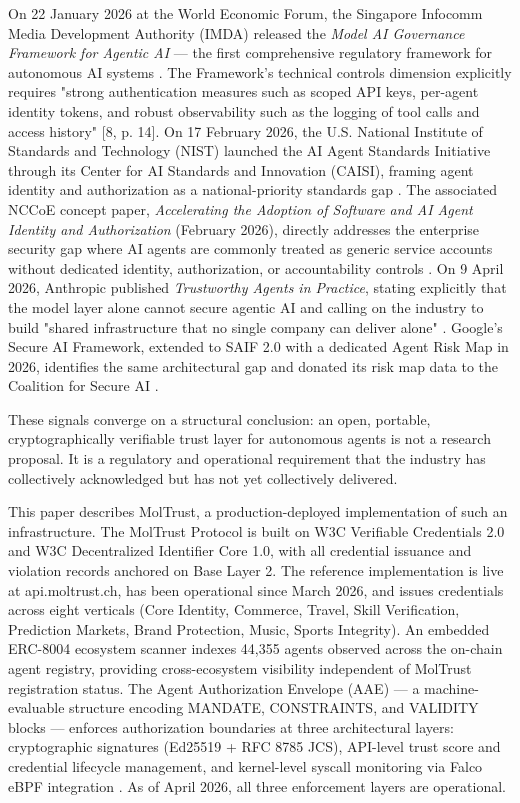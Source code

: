On 22 January 2026 at the World Economic Forum, the Singapore Infocomm Media Development Authority (IMDA) released the \textit{Model AI Governance Framework for Agentic AI} — the first comprehensive regulatory framework for autonomous AI systems \cite{ref8_imda}. The Framework's technical controls dimension explicitly requires "strong authentication measures such as scoped API keys, per-agent identity tokens, and robust observability such as the logging of tool calls and access history" [8, p. 14]. On 17 February 2026, the U.S. National Institute of Standards and Technology (NIST) launched the AI Agent Standards Initiative through its Center for AI Standards and Innovation (CAISI), framing agent identity and authorization as a national-priority standards gap \cite{ref9_nistcaisi}. The associated NCCoE concept paper, \textit{Accelerating the Adoption of Software and AI Agent Identity and Authorization} (February 2026), directly addresses the enterprise security gap where AI agents are commonly treated as generic service accounts without dedicated identity, authorization, or accountability controls \cite{ref10_nccoe}. On 9 April 2026, Anthropic published \textit{Trustworthy Agents in Practice}, stating explicitly that the model layer alone cannot secure agentic AI and calling on the industry to build "shared infrastructure that no single company can deliver alone" \cite{ref11_anthropic}. Google's Secure AI Framework, extended to SAIF 2.0 with a dedicated Agent Risk Map in 2026, identifies the same architectural gap and donated its risk map data to the Coalition for Secure AI \cite{ref12_google}.


These signals converge on a structural conclusion: an open, portable, cryptographically verifiable trust layer for autonomous agents is not a research proposal. It is a regulatory and operational requirement that the industry has collectively acknowledged but has not yet collectively delivered.


This paper describes MolTrust, a production-deployed implementation of such an infrastructure. The MolTrust Protocol is built on W3C Verifiable Credentials 2.0 and W3C Decentralized Identifier Core 1.0, with all credential issuance and violation records anchored on Base Layer 2. The reference implementation is live at api.moltrust.ch, has been operational since March 2026, and issues credentials across eight verticals (Core Identity, Commerce, Travel, Skill Verification, Prediction Markets, Brand Protection, Music, Sports Integrity). An embedded ERC-8004 ecosystem scanner indexes 44,355 agents observed across the on-chain agent registry, providing cross-ecosystem visibility independent of MolTrust registration status. The Agent Authorization Envelope (AAE) — a machine-evaluable structure encoding MANDATE, CONSTRAINTS, and VALIDITY blocks — enforces authorization boundaries at three architectural layers: cryptographic signatures (Ed25519 + RFC 8785 JCS), API-level trust score and credential lifecycle management, and kernel-level syscall monitoring via Falco eBPF integration \cite{ref13_falcobridge}. As of April 2026, all three enforcement layers are operational.


